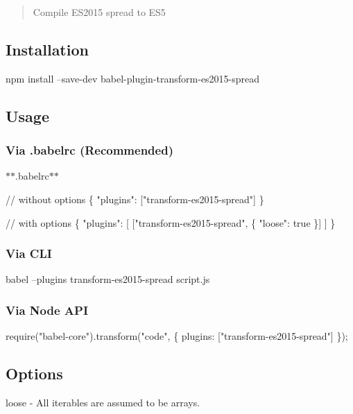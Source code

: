 \begin{quote}
Compile E\+S2015 spread to E\+S5 \end{quote}


\subsection*{Installation}


\begin{DoxyCode}
npm install --save-dev babel-plugin-transform-es2015-spread
\end{DoxyCode}


\subsection*{Usage}

\subsubsection*{Via {\ttfamily .babelrc} (Recommended)}

$\ast$$\ast$.babelrc$\ast$$\ast$


\begin{DoxyCode}
// without options
\{
  "plugins": ["transform-es2015-spread"]
\}

// with options
\{
  "plugins": [
    ["transform-es2015-spread", \{
      "loose": true
    \}]
  ]
\}
\end{DoxyCode}


\subsubsection*{Via C\+LI}


\begin{DoxyCode}
babel --plugins transform-es2015-spread script.js
\end{DoxyCode}


\subsubsection*{Via Node A\+PI}


\begin{DoxyCode}
require("babel-core").transform("code", \{
  plugins: ["transform-es2015-spread"]
\});
\end{DoxyCode}


\subsection*{Options}


\begin{DoxyItemize}
\item {\ttfamily loose} -\/ All iterables are assumed to be arrays. 
\end{DoxyItemize}